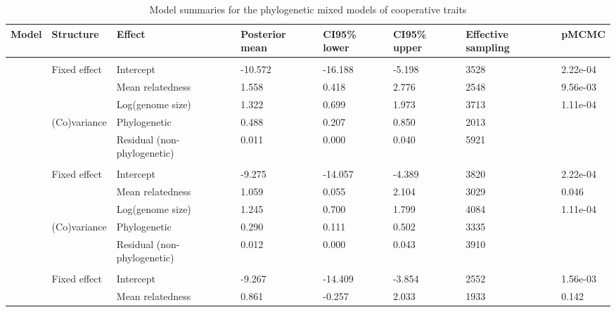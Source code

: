 \begin{table}

\caption{\label{tab:}Model summaries for the phylogenetic mixed models of cooperative traits}
\centering
\begin{tabular}[t]{llllllll}
\toprule
Model & Structure & Effect & Posterior
 mean & CI95\% lower & CI95\% upper & Effective
 sampling & pMCMC\\
\midrule
\addlinespace[0.3em]
\multicolumn{8}{l}{\textbf{Siderophores}}\\
\hspace{1em} & Fixed effect & Intercept & -10.572 & -16.188 & -5.198 & 3528 & 2.22e-04\\
\hspace{1em} &  & Mean relatedness & 1.558 & 0.418 & 2.776 & 2548 & 9.56e-03\\
\hspace{1em} &  & Log(genome size) & 1.322 & 0.699 & 1.973 & 3713 & 1.11e-04\\
\hspace{1em} & (Co)variance & Phylogenetic & 0.488 & 0.207 & 0.850 & 2013 & \\
\hspace{1em} &  & Residual (non-phylogenetic) & 0.011 & 0.000 & 0.040 & 5921 & \\
\addlinespace[0.3em]
\multicolumn{8}{l}{\textbf{Biofilm}}\\
\hspace{1em} & Fixed effect & Intercept & -9.275 & -14.057 & -4.389 & 3820 & 2.22e-04\\
\hspace{1em} &  & Mean relatedness & 1.059 & 0.055 & 2.104 & 3029 & 0.046\\
\hspace{1em} &  & Log(genome size) & 1.245 & 0.700 & 1.799 & 4084 & 1.11e-04\\
\hspace{1em} & (Co)variance & Phylogenetic & 0.290 & 0.111 & 0.502 & 3335 & \\
\hspace{1em} &  & Residual (non-phylogenetic) & 0.012 & 0.000 & 0.043 & 3910 & \\
\addlinespace[0.3em]
\multicolumn{8}{l}{\textbf{Antibiotic degradation}}\\
\hspace{1em} & Fixed effect & Intercept & -9.267 & -14.409 & -3.854 & 2552 & 1.56e-03\\
\hspace{1em} &  & Mean relatedness & 0.861 & -0.257 & 2.033 & 1933 & 0.142\\

\end{tabular}
\end{table}
